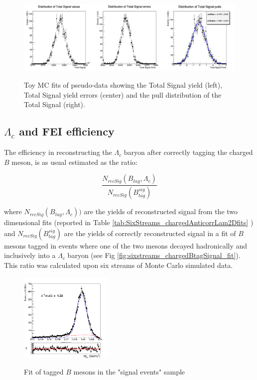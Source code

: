 \begin{figure}[H]
\centering
{\includegraphics[width=1.\textwidth]{06-chargedAnticorrBtoLambda/figs/Total_Signal_chargedBtagToyMCstudy.png}}
\caption{Toy MC fits of pseudo-data showing the Total Signal yield (left), Total Signal yield errors (center) and the pull distribution of the Total Signal (right).}
\label{fig:Total_Signal_chargedBtagToyMCstudy}
\end{figure}


\subsection{$\Lambda_c$ and FEI efficiency}

The efficiency in reconstructing the ${\Lambda_c}$ baryon after correctly tagging the charged $B$ meson, is as usual estimated as the ratio: 

\begin{equation}
    \frac{N_{recSig}(B_{tag}, \Lambda_c)}{N_{recSig}(B_{tag}^{sig})}
\end{equation}

\vspace{0.5cm}

\noindent where $N_{recSig}(B_{tag}, \Lambda_c))$ are the yields of reconstructed signal from the two dimensional fits (reported in Table \ref{tab:SixStreams_chargedAnticorrLam2Dfits} ) and  $N_{recSig}(B_{tag}^{sig})$ are the yields of correctly reconstructed signal in a fit of $B$ mesons tagged in events where one of the two mesons decayed hadronically and inclusively into a ${\Lambda_c}$ baryon (see Fig \ref{fig:sixstreams_chargedBtagSignal_fit}). This ratio was calculated upon six streams of Monte Carlo simulated data.

\begin{figure}[h!]
\centering
{\includegraphics[width=0.40\textwidth]{06-chargedAnticorrBtoLambda/figs/chargedBtag_anticorrLambdaC_TotalSignalBtag_fit.png}}
\caption{Fit of tagged $B$ mesons in the "signal events" sample}
\label{fig:chargedBtag_anticorrLambdaC_TotalSignalBtag_fit}
\end{figure}


